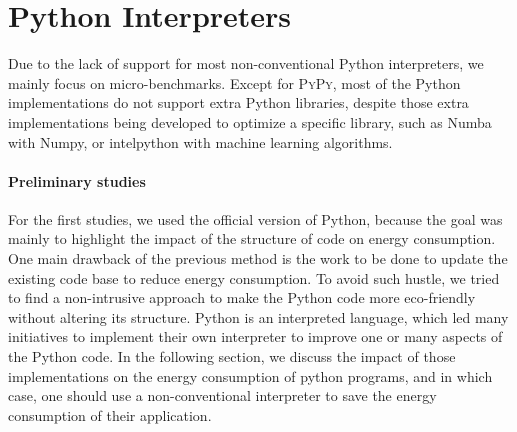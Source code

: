 \section{Python Interpreters}\label{sec:pythoninterpreters}
Due to the lack of support for most non-conventional Python interpreters, we mainly focus on micro-benchmarks.
Except for \textsc{PyPy}, most of the Python implementations do not support extra Python libraries, despite those extra implementations being developed to optimize a specific library, such as \textsf{Numba} with \textsf{Numpy}, or \textsf{intelpython} with machine learning algorithms.


\paragraph{Preliminary studies}
For the first studies, we used the official version of Python, because the goal was mainly to highlight the impact of the structure of code on energy consumption.
One main drawback of the previous method is the work to be done to update the existing code base to reduce  energy consumption.
To avoid such hustle, we tried to find a non-intrusive approach to make the Python code more eco-friendly without altering its structure.
Python is an interpreted language, which led many initiatives to implement their own interpreter to improve one or many aspects of the Python code.
In the following section, we discuss the impact of those implementations on the energy consumption of python programs, and in which case, one should use a non-conventional interpreter to save the energy consumption of their application.

